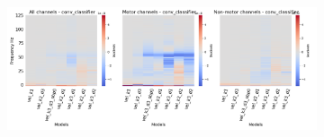 \begin{figure}[!htpb]
\begin{subfigure}[b]{\textwidth}
   \includegraphics[width=1\linewidth]{img/appendix/A/conv-classifier/sm/vel-model-gradients_all_kinds}
   \caption{}
   \label{fig:vel-shifted-grads-conv-classifier}
\end{subfigure}

\caption[]{}
\label{fig:vel-shifted-grads}
\end{figure}
